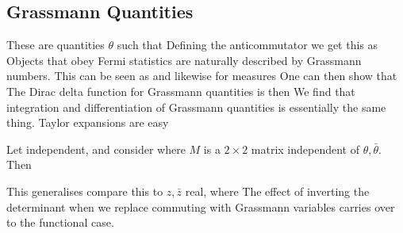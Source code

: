 \documentclass{article}
\begin{document}
\subsection{Grassmann Quantities}
These are quantities $\theta$ such that 
Defining the anticommutator we get this as 
Objects that obey Fermi statistics are naturally described by Grassmann numbers. This can be seen as 
and likewise for measures 
One can then show that 
The Dirac delta function for Grassmann quantities is then  
\eq{
\delta(\theta) = \theta
}
We find that integration and differentiation of Grassmann quantities is essentially the same thing. Taylor expansions are easy 

\begin{example}
Let 
independent, and consider 
where $M$ is a $2\times2$ matrix independent of $\theta,\bar{\theta}$. Then 
\end{example}

This generalises 
compare this to $z, \bar{z}$ real, where 
The effect of inverting the determinant when we replace commuting with Grassmann variables carries over to the functional case. 
\end{document}
